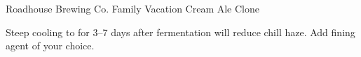\begin{recipe}{Roadhouse Brewing Co. Family Vacation Cream Ale Clone}

\begin{aboutblock}
\sourceaha
\end{aboutblock}


\begin{methodandtiming}

\begin{mashsteps}
\end{mashsteps}

\begin{fermentationsteps}
\end{fermentationsteps}

\begin{directions}
Steep cooling to  for 3--7 days after fermentation will reduce chill haze.
Add fining agent of your choice.
\end{directions}

\end{methodandtiming}

\recipebreak

\begin{ingredientsblock}

\begin{malts}
\end{malts}

\begin{hops}
\end{hops}


\end{ingredientsblock}

\end{recipe}
